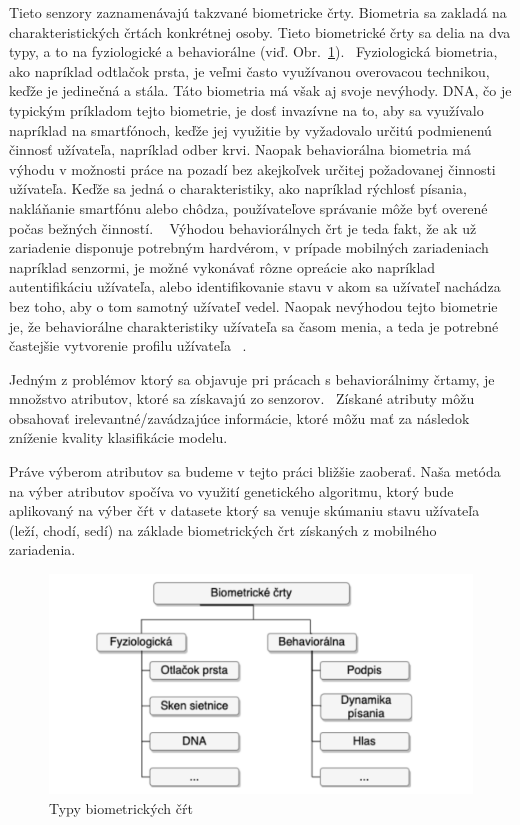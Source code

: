 \documentclass[runningheads]{llncs}
\begin{document}
Tieto senzory zaznamenávajú takzvané biometricke črty.  
Biometria sa zakladá na charakteristických črtách konkrétnej osoby. Tieto biometrické 
črty sa delia na dva typy, a to na fyziologické a behaviorálne 
(viď. Obr.~\ref{fig_rozdelenie_biometrie}).~\cite{ref_teh} Fyziologická biometria, 
ako napríklad odtlačok prsta, je veľmi často využívanou overovacou technikou, 
keďže je jedinečná a stála. Táto biometria má však aj svoje nevýhody. 
DNA, čo je typickým príkladom tejto biometrie, je dosť invazívne na to, 
aby sa využívalo napríklad na smartfónoch, keďže jej využitie by 
vyžadovalo určitú podmienenú činnosť užívateľa, napríklad odber krvi. 
Naopak behaviorálna biometria má výhodu v možnosti práce na pozadí bez akejkoľvek 
určitej požadovanej činnosti užívateľa. Keďže sa jedná o charakteristiky, 
ako napríklad rýchlosť písania, nakláňanie smartfónu alebo chôdza, 
používateľove správanie môže byť overené počas bežných činností. ~\cite{ref_teh}
Výhodou behaviorálnych črt je teda fakt, 
že ak už zariadenie disponuje potrebným hardvérom, 
v prípade mobilných zariadeniach napríklad senzormi, 
je možné vykonávať rôzne opreácie ako napríklad autentifikáciu užívateľa, alebo 
identifikovanie stavu v akom sa užívateľ nachádza bez toho, aby o 
tom samotný užívateľ vedel. Naopak nevýhodou tejto biometrie je, 
že behaviorálne charakteristiky užívateľa sa časom menia, 
a teda je potrebné častejšie vytvorenie profilu užívateľa ~\cite{ref_seyd}. 

Jedným z problémov ktorý sa objavuje pri prácach s behaviorálnimy črtamy, 
je množstvo atributov, ktoré sa získavajú zo senzorov.~\cite{ref_nascimento} 
Získané atributy môžu obsahovať irelevantné/zavádzajúce informácie, ktoré
môžu mať za následok zníženie kvality klasifikácie modelu.
~\cite{ref_babatunde,ref_lu,ref_nascimento,ref_smith,ref_zhao} 

Práve výberom atributov sa 
budeme v tejto práci bližšie zaoberať. Naša metóda na výber atributov spočíva vo využití 
genetického algoritmu, ktorý bude aplikovaný na výber čŕt v datasete ktorý sa venuje skúmaniu
stavu užívateľa (leží, chodí, sedí) na základe biometrických črt získaných z 
mobilného zariadenia.~\cite{ref_dataset_anguita,ref_dataset}


\begin{figure}
\includegraphics[width=\textwidth]{image/rozdelenie_biometrie.png}
\caption{Typy biometrických čŕt~\cite{ref_teh}} \label{fig_rozdelenie_biometrie}
\end{figure}
\end{document}
